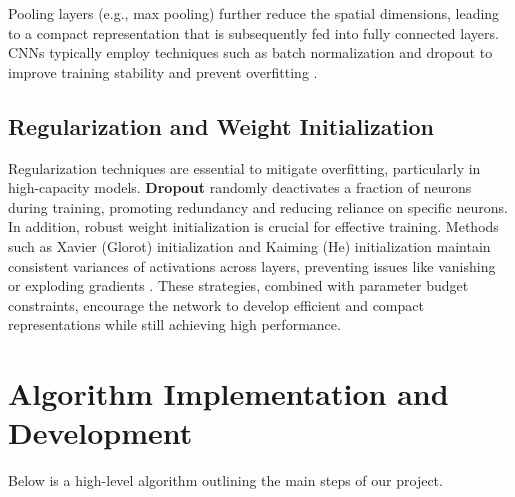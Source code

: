 \documentclass[11pt]{amsart}
\begin{document}
Pooling layers (e.g., max pooling) further reduce the spatial dimensions, leading to a compact representation that is subsequently fed into fully connected layers. CNNs typically employ techniques such as batch normalization and dropout to improve training stability and prevent overfitting \cite{srivastava2014dropout}.

\subsection*{Regularization and Weight Initialization}
Regularization techniques are essential to mitigate overfitting, particularly in high-capacity models. \textbf{Dropout} randomly deactivates a fraction of neurons during training, promoting redundancy and reducing reliance on specific neurons. In addition, robust weight initialization is crucial for effective training. Methods such as Xavier (Glorot) initialization and Kaiming (He) initialization maintain consistent variances of activations across layers, preventing issues like vanishing or exploding gradients \cite{he2015delving}. These strategies, combined with parameter budget constraints, encourage the network to develop efficient and compact representations while still achieving high performance.

\section{Algorithm Implementation and Development}\label{sec:algorithms}
Below is a high-level algorithm outlining the main steps of our project.
\end{document}
